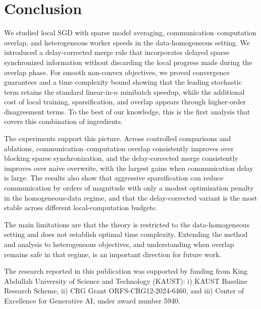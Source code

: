 \documentclass{article}
\theoremstyle{plain}
\theoremstyle{definition}
\begin{document}
\section{Conclusion}\label{sec:conclusion}
% 
We studied local SGD with sparse model averaging, communication--computation overlap, and heterogeneous worker speeds in the data-homogeneous setting. We introduced a delay-corrected merge rule that incorporates delayed sparse synchronized information without discarding the local progress made during the overlap phase.
For smooth non-convex objectives, we proved convergence guarantees and a time complexity bound showing that the leading stochastic term retains the standard linear-in-\(n\) minibatch speedup, while the additional cost of local training, sparsification, and overlap appears through higher-order disagreement terms.
To the best of our knowledge, this is the first analysis that covers this combination of ingredients.

The experiments support this picture. Across controlled comparisons and ablations, communication--computation overlap consistently improves over blocking sparse synchronization, and the delay-corrected merge consistently improves over naive overwrite, with the largest gains when communication delay is large.
The results also show that aggressive sparsification can reduce communication by orders of magnitude with only a modest optimization penalty in the homogeneous-data regime, and that the delay-corrected variant is the most stable across different local-computation budgets.

The main limitations are that the theory is restricted to the data-homogeneous setting and does not establish optimal time complexity.
Extending the method and analysis to heterogeneous objectives, and understanding when overlap remains safe in that regime, is an important direction for future work. 
\begin{ack}
    The research reported in this publication was supported by funding from King Abdullah University of Science and Technology (KAUST): i) KAUST Baseline Research Scheme, ii) CRG Grant ORFS-CRG12-2024-6460, and iii) Center of Excellence for Generative AI, under award number 5940.
\end{ack}
{
\small


}
\newpage
\appendix
\tableofcontents
% 
% 
% 
\newpage
\end{document}
